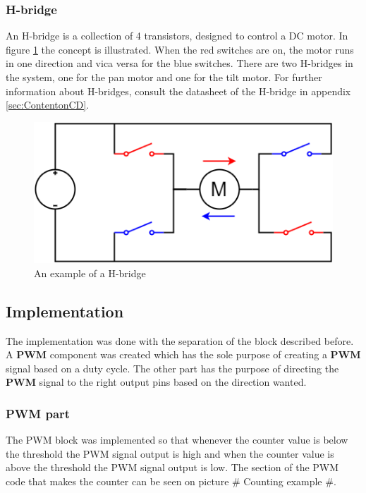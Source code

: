 \subsubsection{H-bridge}
An H-bridge is a collection of 4 transistors, designed to control a DC motor. In figure \ref{fig:H-bridge} the concept is illustrated. When the red switches are on, the motor runs in one direction and vica versa for the blue switches. There are two H-bridges in the system, one for the pan motor and one for the tilt motor. For further information about H-bridges, consult the datasheet of the H-bridge in appendix \ref{sec:ContentonCD}.

\begin{figure}[h!]
\centering
\includegraphics[scale=0.5]{Billeder/H-bridge.png}
\caption{ An example of a H-bridge }
\label{fig:H-bridge}
\end{figure}

\subsection{Implementation}

The implementation was done with the separation of the block described before. A \textbf{PWM} component was created which has the sole purpose of creating a \textbf{PWM} signal based on a duty cycle. The other part has the purpose of directing the \textbf{PWM} signal to the right output pins based on the direction wanted.

\subsubsection{PWM part}

The PWM block was implemented so that whenever the counter value is below the threshold the PWM signal output is high and when the counter value is above the threshold the PWM signal output is low. The section of the PWM code that makes the counter can be seen on picture \# Counting example \#.


